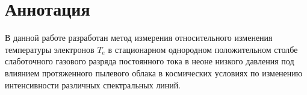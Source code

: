 \chapter*{Аннотация}

В данной работе разработан метод измерения относительного изменения температуры электронов $T_e$
в стационарном однородном положительном столбе слаботочного газового разряда
постоянного тока в неоне низкого давления под влиянием протяженного пылевого
облака в космических условиях по изменению интенсивности различных спектральных линий.
